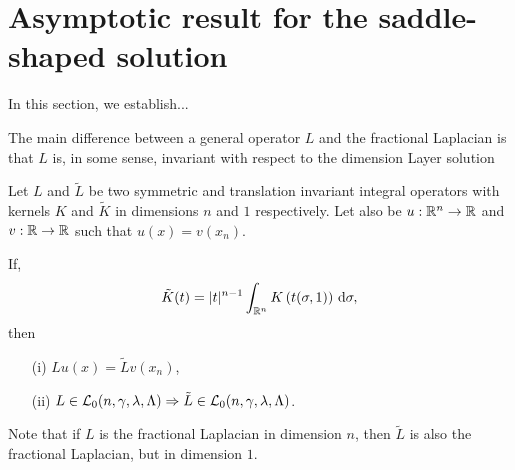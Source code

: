 \section{Asymptotic result for the saddle-shaped solution}
\label{Sec:Asymptotic}

In this section, we establish...


The main difference between a general operator $L$ and the fractional Laplacian is that $L$ is, in some sense, invariant with respect to the dimension 
Layer solution


\begin{proposition}
	\label{Prop:KernelsDimension}
	Let $L$ and $\tilde{L}$ be two symmetric and translation invariant integral operators with kernels $K$ and $\tilde{K}$ in dimensions $n$ and $1$ respectively. Let also be $u:\mathbb{R}^n\to\mathbb{R}$ and $v:\mathbb{R}\to\mathbb{R}$ such that $u(x) = v(x_n)$.
	
	If,
	$$ \tilde{K}(t) = |t|^{n-1} \int_{\mathbb{R}^n} K\left(t(\sigma,1)\right) \,\mathrm{d} \sigma, $$
	then
	\begin{enumerate}
		\item[(i)] $Lu(x) = \tilde{L}v(x_n)$,
		\item[(ii)] $L\in \mathcal{L}_0 (n,\gamma,\lambda,\Lambda) \Rightarrow \tilde{L}\in \mathcal{L}_0 (n,\gamma,\lambda,\Lambda)$.
	\end{enumerate}
\end{proposition}

Note that if $L$ is the fractional Laplacian in dimension $n$, then $\tilde{L}$ is also the fractional Laplacian, but in dimension $1$.

